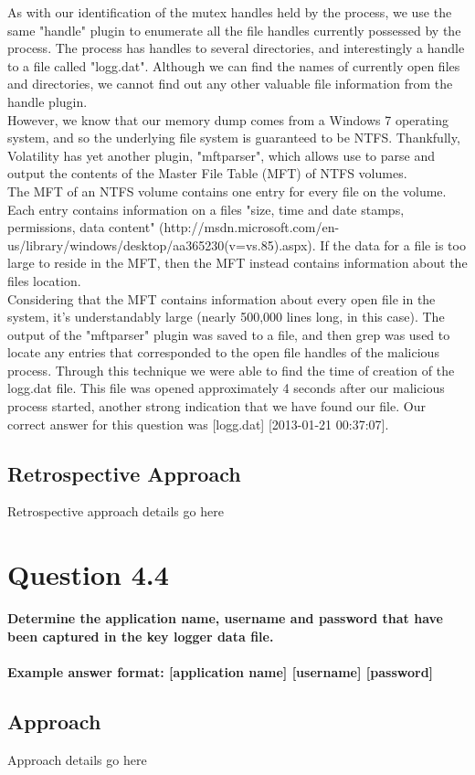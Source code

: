 As with our identification of the mutex handles held by the process, we use the same "handle" plugin to enumerate all the file handles currently possessed by the process. The process has handles to several directories, and interestingly a handle to a file called "logg.dat". Although we can find the names of currently open files and directories, we cannot find out any other valuable file information from the handle plugin.\\
However, we know that our memory dump comes from a Windows 7 operating system, and so the underlying file system is guaranteed to be NTFS. Thankfully, Volatility has yet another plugin, "mftparser", which allows use to parse and output the contents of the Master File Table (MFT) of NTFS volumes.\\
The MFT of an NTFS volume contains one entry for every file on the volume. Each entry contains information on a files "size, time and date stamps, permissions, data content" (http://msdn.microsoft.com/en-us/library/windows/desktop/aa365230(v=vs.85).aspx). If the data for a file is too large to reside in the MFT, then the MFT instead contains information about the files location.\\
Considering that the MFT contains information about every open file in the system, it's understandably large (nearly 500,000 lines long, in this case). The output of the "mftparser" plugin was saved to a file, and then grep was used to locate any entries that corresponded to the open file handles of the malicious process. Through this technique we were able to find the time of creation of the logg.dat file. This file was opened approximately 4 seconds after our malicious process started, another strong indication that we have found our file. Our correct answer for this question was [logg.dat] [2013-01-21 00:37:07]. 
\subsection{Retrospective Approach}
Retrospective approach details go here

\section{Question 4.4}
\textbf{Determine the application name, username and password that have been
captured in the key logger data file.
\\\\
Example answer format: [application name] [username] [password]}
\subsection{Approach}
Approach details go here
